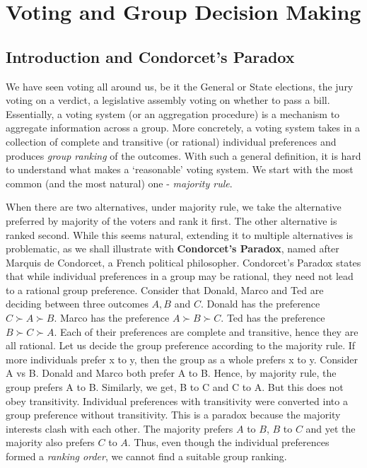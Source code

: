 \documentclass{article}
\theoremstyle{definition}
\begin{document}
\section{Voting and Group Decision Making}

\subsection{Introduction and Condorcet's Paradox}

We have seen voting all around us, be it the General or State elections, the jury voting on a verdict, a legislative assembly voting on whether to pass a bill. Essentially, a voting system (or an aggregation procedure) is a mechanism to aggregate information across a group. More concretely, a voting system takes in a collection of complete and transitive (or rational) individual preferences and produces \textit{group ranking} of the outcomes. With such a general definition, it is hard to understand what makes a `reasonable' voting system. We start with the most common (and the most natural) one - \textit{majority rule}. \medskip

When there are two alternatives, under majority rule, we take the alternative preferred by majority of the voters and rank it first. The other alternative is ranked second. While this seems natural, extending it to multiple alternatives is problematic, as we shall illustrate with \textbf{Condorcet's Paradox}, named after Marquis de Condorcet, a French political philosopher. Condorcet's Paradox states that while individual preferences in a group may be rational, they need not lead to a rational group preference. Consider that Donald, Marco and Ted are deciding between three outcomes $A,B$ and $C$. Donald has the preference $C \succ A \succ B$. Marco has the preference $A \succ B \succ C$. Ted has the preference $B \succ C \succ A$. Each of their preferences are complete and transitive, hence they are all rational. Let us decide the group preference according to the majority rule. If more individuals prefer x to y, then the group as a whole prefers x to y. Consider A vs B. Donald and Marco both prefer A to B. Hence, by majority rule, the group prefers A to B. Similarly, we get, B to C and C to A. But this does not obey transitivity. Individual preferences with transitivity were converted into a group preference without transitivity. This is a paradox because the majority interests clash with each other. The majority prefers $A$ to $B$, $B$ to $C$ and yet the majority also prefers $C$ to $A$. Thus, even though the individual preferences formed a \textit{ranking order}, we cannot find a suitable group ranking. \medskip
\end{document}
